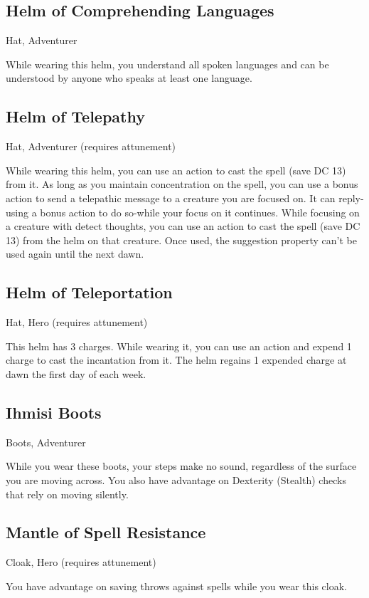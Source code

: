 \subsection{Helm of Comprehending Languages}
Hat, Adventurer

While wearing this helm, you understand all spoken languages and can be understood by anyone who speaks at least one language.

\subsection{Helm of Telepathy}
Hat, Adventurer (requires attunement)

While wearing this helm, you can use an action to cast the  spell (save DC 13) from it. As long as you maintain concentration on the spell, you can use a bonus action to send a telepathic message to a creature you are focused on. It can reply-using
a bonus action to do so-while your focus on it continues. While focusing on a creature with detect thoughts, you can use an action to cast the
 spell (save DC 13) from the helm on that creature. Once used, the suggestion property can't be used again until the next dawn.

\subsection{Helm of Teleportation}
Hat, Hero (requires attunement)

This helm has 3 charges. While wearing it, you can use an action and expend 1 charge to cast the  incantation from it. The helm regains 1 expended charge at dawn the first day of each week.

\subsection{Ihmisi Boots}
Boots, Adventurer 

While you wear these boots, your steps make no sound, regardless of the surface you are moving across. You also have advantage on Dexterity (Stealth) checks that rely on moving silently.

\subsection{Mantle of Spell Resistance}
Cloak, Hero (requires attunement)

You have advantage on saving throws against spells while you wear this cloak.

